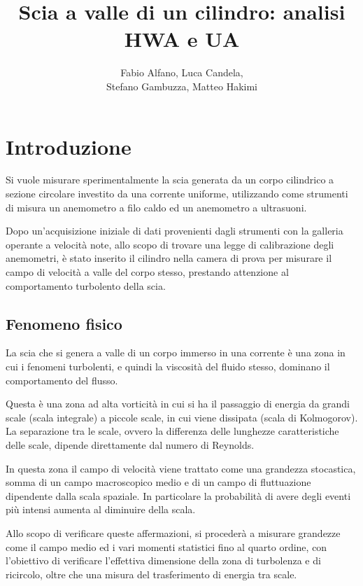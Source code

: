 \documentclass{article} %
\title{\huge Scia a valle di un cilindro: analisi HWA e UA}
\author{Fabio Alfano, Luca Candela,\\Stefano Gambuzza, Matteo Hakimi}
\date{}
\begin{document}
\maketitle
\newpage
\tableofcontents
\newpage

\section{Introduzione}
Si vuole misurare sperimentalmente la scia generata da un corpo cilindrico a sezione circolare investito da una corrente uniforme, utilizzando come strumenti di misura un anemometro a filo caldo ed un anemometro a ultrasuoni. \par
Dopo un'acquisizione iniziale di dati provenienti dagli strumenti con la galleria operante a velocità note, allo scopo di trovare una legge di calibrazione degli anemometri, è stato inserito il cilindro nella camera di prova per misurare il campo di velocità a valle del corpo stesso, prestando attenzione al comportamento turbolento della scia.

\subsection{Fenomeno fisico}
La scia che si genera a valle di un corpo immerso in una corrente è una zona in cui i fenomeni turbolenti, e quindi la viscosità del fluido stesso, dominano il comportamento del flusso.\par
Questa è una zona ad alta vorticità in cui si ha il passaggio di energia da grandi scale (scala integrale) a piccole scale, in cui viene dissipata (scala di Kolmogorov). La separazione tra le scale, ovvero la differenza delle lunghezze caratteristiche delle scale, dipende direttamente dal numero di Reynolds.\par
In questa zona il campo di velocità viene trattato come una grandezza stocastica, somma di un campo macroscopico medio e di un campo di fluttuazione dipendente dalla scala spaziale. In particolare la probabilità di avere degli eventi più intensi aumenta al diminuire della scala.\par
Allo scopo di verificare queste affermazioni, si procederà a misurare grandezze come il campo medio ed i vari momenti statistici fino al quarto ordine, con l'obiettivo di verificare l'effettiva dimensione della zona di turbolenza e di ricircolo, oltre che una misura del trasferimento di energia tra scale.\par
\end{document}
